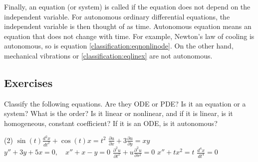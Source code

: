 \medskip

Finally, an equation (or system) is called \emph{}
if the equation does not depend on the independent variable.
For autonomous ordinary differential equations, the
independent variable is then thought of as time.  Autonomous equation
means an equation that does not change with time.
For example, Newton's law of cooling is autonomous, so is equation
\eqref{classification:eqnonlinode}.  On the other hand, mechanical
vibrations or 
\eqref{classification:eqlinex} are not autonomous.

\subsection{Exercises}

\begin{exercise}
	Classify the following equations.  Are they ODE or PDE\@?  Is it an equation
	or a system?  What is the order?  Is it linear or nonlinear, and if it is
	linear, is it homogeneous, constant coefficient?  If it is an ODE\@, is it
	autonomous?
	\begin{tasks}(2)
		\task $\displaystyle \sin(t) \frac{d^2 x}{dt^2} + \cos(t) x = t^2$
		\task $\displaystyle \frac{\partial u}{\partial x} + 3 \frac{\partial u}{\partial y} = xy$
		\task $\displaystyle y''+3y+5x=0, \quad x''+x-y=0$
		\task $\displaystyle \frac{\partial^2 u}{\partial t^2} + u\frac{\partial^2 u}{\partial s^2} =
		0$
		\task $\displaystyle x''+tx^2=t$
		\task $\displaystyle \frac{d^4 x}{dt^4} = 0$
	\end{tasks}
\end{exercise}

